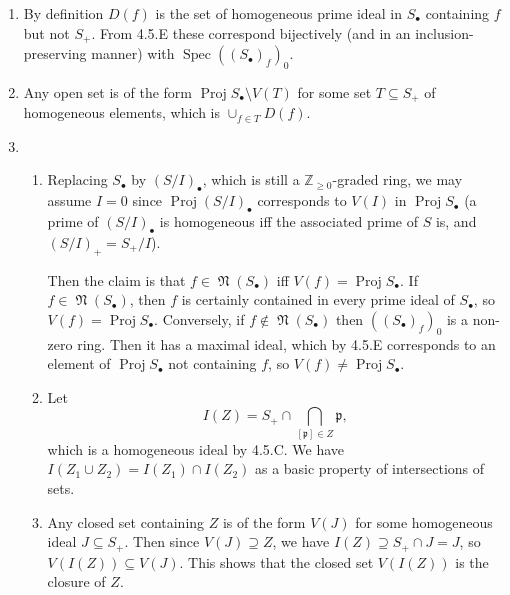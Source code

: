 \documentclass{report}
\newcommand{\p}{\mathfrak{p}}
\newcommand{\Z}{\mathbb{Z}}
\DeclareMathOperator{\Spec}{Spec}
\DeclareMathOperator{\Proj}{Proj}
\DeclareMathOperator{\nilrad}{\mathfrak{N}}
\begin{document}
\begin{enumerate}[label=\textbf{4.5.\Alph*.}]
	\item By definition $D(f)$ is the set of homogeneous prime ideal in
	      $S_\bullet$ containing $f$ but not $S_+$. From 4.5.E these correspond
	      bijectively (and in an inclusion-preserving manner) with
	      $\Spec((S_\bullet)_f)_0$.

	\item Any open set is of the form $\Proj S_\bullet\setminus V(T)$ for some
	      set $T\subseteq S_+$ of homogeneous elements, which is
	      $\cup_{f\in T}D(f)$.

	\item
	      \begin{enumerate}[label=(\alph*)]
		      \item Replacing $S_\bullet$ by $(S/I)_\bullet$, which is still a
		            $\Z_{\ge0}$-graded ring, we may assume $I=0$ since
		            $\Proj(S/I)_\bullet$ corresponds to $V(I)$ in $\Proj S_\bullet$
		            (a prime of $(S/I)_\bullet$ is homogeneous iff the associated
		            prime of $S$ is, and $(S/I)_+=S_+/I$).

		            Then the claim is that $f\in\nilrad(S_\bullet)$ iff
		            $V(f)=\Proj S_\bullet$. If $f\in\nilrad(S_\bullet)$, then $f$ is
		            certainly contained in every prime ideal of $S_\bullet$, so
		            $V(f)=\Proj S_\bullet$. Conversely, if
		            $f\notin\nilrad(S_\bullet)$ then $((S_\bullet)_f)_0$ is a
		            non-zero ring. Then it has a maximal ideal, which by 4.5.E
		            corresponds to an element of $\Proj S_\bullet$ not containing
		            $f$, so $V(f)\ne\Proj S_\bullet$.

		      \item Let
		            \begin{equation*}
			            I(Z)=S_+\cap\bigcap_{[\p]\in Z}\p,
		            \end{equation*}
		            which is a homogeneous ideal by 4.5.C. We have
		            $I(Z_1\cup Z_2)=I(Z_1)\cap I(Z_2)$ as a basic property of
		            intersections of sets.

		      \item Any closed set containing $Z$ is of the form $V(J)$ for some
		            homogeneous ideal $J\subseteq S_+$. Then since $V(J)\supseteq Z$,
		            we have $I(Z)\supseteq S_+\cap J=J$, so $V(I(Z))\subseteq V(J)$.
		            This shows that the closed set $V(I(Z))$ is the closure of $Z$.
	      \end{enumerate}


\end{enumerate}
\end{document}
